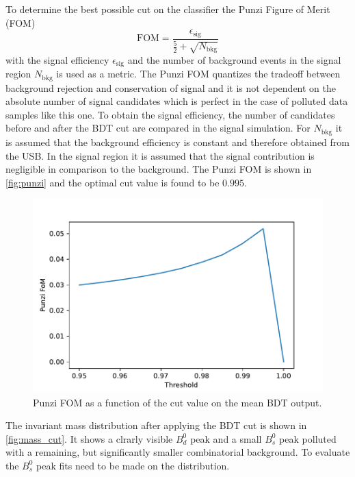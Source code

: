 To determine the best possible cut on the classifier the Punzi Figure of Merit (FOM)
\begin{equation*}
  \mathrm{FOM} = \frac{\epsilon_\mathrm{sig}}{\frac{5}{2} + \sqrt{N_\mathrm{bkg}}}
\end{equation*}
with the signal efficiency $\epsilon_\mathrm{sig}$ and the number of background events in the signal region $N_\mathrm{bkg}$ is used as a metric. The Punzi FOM quantizes the tradeoff between background rejection and conservation of signal and it is not dependent on the absolute number of signal candidates which is perfect in the case of polluted data samples like this one.
To obtain the signal efficiency, the number of candidates before and after the BDT cut are compared in the signal simulation. For $N_\mathrm{bkg}$ it is assumed that the background efficiency is constant and therefore obtained from the USB. In the signal region it is assumed that the signal contribution is negligible in comparison to the background.
The Punzi FOM is shown in \autoref{fig:punzi} and the optimal cut value is found to be $\num{0.995}$.

\begin{figure}[tb]
  \centering
  \includegraphics[width=.8\textwidth]{plots/FoM.pdf}
  \caption{Punzi FOM as a function of the cut value on the mean BDT output.}
  \label{fig:punzi}
\end{figure}

The invariant mass distribution after applying the BDT cut is shown in \autoref{fig:mass_cut}. It shows a clrarly visible $B^0_d$ peak and a small $B^0_s$ peak polluted with a remaining, but significantly smaller combinatorial background. To evaluate the $B^0_s$ peak fits need to be made on the distribution.

